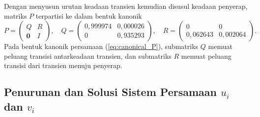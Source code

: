 \documentclass[12pt,a4paper]{article}
\numberwithin{equation}{section}
\begin{document}
Dengan menyusun urutan keadaan transien kemudian disusul keadaan penyerap, matriks $P$ terpartisi ke dalam bentuk kanonik \cite{kemeny1976}
\begin{equation}
  P = 
  \begin{pmatrix}
    Q & R \\
    \mathbf{0} & I
  \end{pmatrix},
  \quad
  Q = 
  \begin{pmatrix}
    0{,}999974 & 0{,}000026 \\
    0          & 0{,}935293
  \end{pmatrix},
  \quad
  R = 
  \begin{pmatrix}
    0          & 0 \\
    0{,}062643 & 0{,}002064
  \end{pmatrix}.
  \label{eq:canonical_P}
\end{equation}
Pada bentuk kanonik persamaan (\ref{eq:canonical_P}), submatriks $Q$ memuat peluang transisi antarkeadaan transien, dan submatriks $R$ memuat peluang transisi dari transien menuju penyerap.

\subsection{Penurunan dan Solusi Sistem Persamaan \texorpdfstring{$u_i$}{u\_i} dan \texorpdfstring{$v_i$}{v\_i}}
\end{document}
